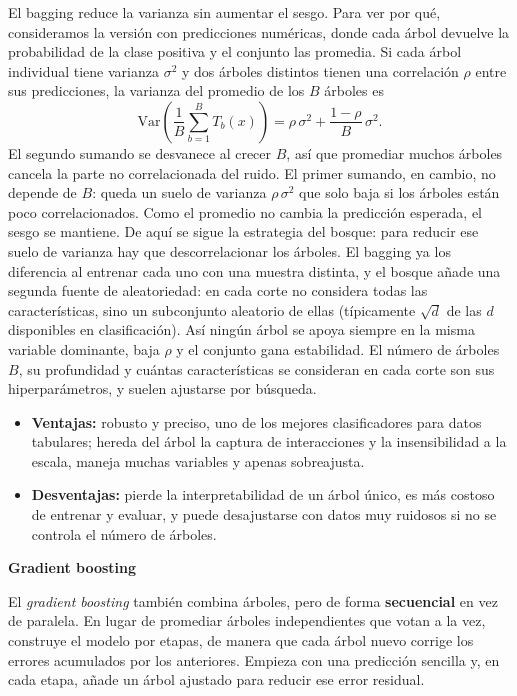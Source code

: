 \documentclass[12pt,a4paper]{report}
\theoremstyle{definition}
\begin{document}
El bagging reduce la varianza sin aumentar el sesgo. Para ver por qué, consideramos la versión con
predicciones numéricas, donde cada árbol devuelve la probabilidad de la clase positiva y el conjunto
las promedia. Si cada árbol individual tiene varianza
$\sigma^2$ y dos árboles distintos tienen una correlación $\rho$ entre sus predicciones, la varianza
del promedio de los $B$ árboles es
\begin{equation}
\mathrm{Var}\!\left(\frac{1}{B}\sum_{b=1}^{B} T_b(x)\right)
= \rho\,\sigma^2 + \frac{1-\rho}{B}\,\sigma^2.
\label{eq:varbagging}
\end{equation}
El segundo sumando se desvanece al crecer $B$, así que promediar muchos árboles cancela la parte no
correlacionada del ruido. El
primer sumando, en cambio, no depende de $B$: queda un suelo de varianza $\rho\,\sigma^2$ que solo baja
si los árboles están poco correlacionados. Como el promedio no cambia la predicción esperada, el sesgo
se mantiene. De aquí se sigue la estrategia del bosque: para reducir ese suelo de varianza hay que
descorrelacionar los árboles. El bagging ya los diferencia al entrenar cada uno con una muestra distinta, y el bosque añade
una segunda fuente de aleatoriedad: en cada corte no considera todas las características, sino un
subconjunto aleatorio de ellas (típicamente $\sqrt{d}$ de las $d$ disponibles en clasificación). Así ningún árbol
se apoya siempre en la misma variable dominante, baja $\rho$ y el conjunto gana estabilidad. El número
de árboles $B$, su profundidad y cuántas características se consideran en cada corte son sus
hiperparámetros, y suelen ajustarse por búsqueda.

\begin{itemize}
\item \textbf{Ventajas:} robusto y preciso, uno de los mejores clasificadores para datos tabulares;
hereda del árbol la captura de interacciones y la insensibilidad a la escala, maneja muchas variables y
apenas sobreajusta.
\item \textbf{Desventajas:} pierde la interpretabilidad de un árbol único, es más costoso de entrenar y
evaluar, y puede desajustarse con datos muy ruidosos si no se controla el número de árboles.
\end{itemize}

\bigskip
\noindent\textbf{\large Gradient boosting}
\label{sec:gb}

\medskip
El \emph{gradient boosting} \cite{friedman2001gbm} también combina árboles, pero de forma
\textbf{secuencial} en vez de paralela. En lugar de promediar árboles independientes que votan a la
vez, construye el modelo por etapas, de manera que cada árbol nuevo corrige los errores acumulados por los
anteriores. Empieza con una predicción sencilla y, en cada etapa, añade un árbol ajustado para reducir
ese error residual.
\end{document}
